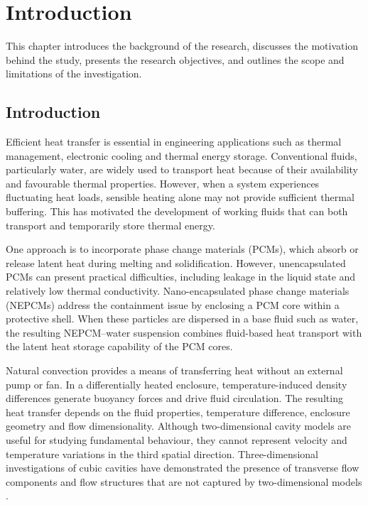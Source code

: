 \chapter{Introduction}

This chapter introduces the background of the research, discusses the motivation behind the study, presents the research objectives, and outlines the scope and limitations of the investigation.

\section{Introduction}

Efficient heat transfer is essential in engineering applications such as thermal management, electronic cooling and thermal energy storage. Conventional fluids, particularly water, are widely used to transport heat because of their availability and favourable thermal properties. However, when a system experiences fluctuating heat loads, sensible heating alone may not provide sufficient thermal buffering. This has motivated the development of working fluids that can both transport and temporarily store thermal energy.

One approach is to incorporate phase change materials (PCMs), which absorb or release latent heat during melting and solidification. However, unencapsulated PCMs can present practical difficulties, including leakage in the liquid state and relatively low thermal conductivity. Nano-encapsulated phase change materials (NEPCMs) address the containment issue by enclosing a PCM core within a protective shell. When these particles are dispersed in a base fluid such as water, the resulting NEPCM--water suspension combines fluid-based heat transport with the latent heat storage capability of the PCM cores.

Natural convection provides a means of transferring heat without an external pump or fan. In a differentially heated enclosure, temperature-induced density differences generate buoyancy forces and drive fluid circulation. The resulting heat transfer depends on the fluid properties, temperature difference, enclosure geometry and flow dimensionality. Although two-dimensional cavity models are useful for studying fundamental behaviour, they cannot represent velocity and temperature variations in the third spatial direction. Three-dimensional investigations of cubic cavities have demonstrated the presence of transverse flow components and flow structures that are not captured by two-dimensional models \citep{fusegi1991,tric2000,wakashima2004}.

